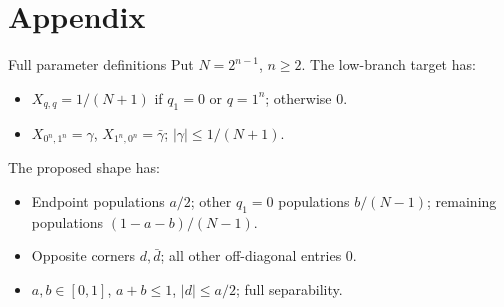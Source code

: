 \documentclass{beamer}
\begin{document}
\section{Appendix}
\begin{frame}{Full parameter definitions}
Put $N=2^{n-1}$, $n\ge2$. The low-branch target has:
\begin{itemize}
\item $X_{q,q}=1/(N+1)$ if $q_1=0$ or $q=1^n$; otherwise $0$.
\item $X_{0^n,1^n}=\gamma$, $X_{1^n,0^n}=\bar\gamma$; $|\gamma|\le1/(N+1)$.
\end{itemize}
The proposed shape has:
\begin{itemize}
\item Endpoint populations $a/2$; other $q_1=0$ populations $b/(N-1)$; remaining populations $(1-a-b)/(N-1)$.
\item Opposite corners $d,\bar d$; all other off-diagonal entries $0$.
\item $a,b\in[0,1]$, $a+b\le1$, $|d|\le a/2$; full separability.
\end{itemize}
\end{frame}
\FormalVerification
\end{document}
